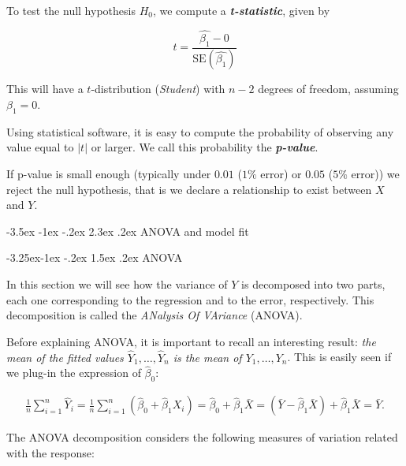 \documentclass[]{book}
\makeatletter
\renewcommand\section{\@startsection {section}{1}{\z@}%
                                   {-3.5ex \@plus -1ex \@minus -.2ex}%
                                   {2.3ex \@plus.2ex}%
                                   {\normalfont\Large\bfseries\color{ForestGreen}}}
\renewcommand\subsection{\@startsection{subsection}{2}{\z@}%
                                     {-3.25ex\@plus -1ex \@minus -.2ex}%
                                     {1.5ex \@plus .2ex}%
                                     {\normalfont\large\bfseries\color{Violet}}}
\theoremstyle{definition}
\theoremstyle{definition}
\theoremstyle{definition}
\theoremstyle{remark}
\makeatother
\begin{document}
To test the null hypothesis \(H_0\), we compute a
\textbf{\emph{t-statistic}}, given by

\[ t = \frac{\hat{\beta_1} - 0}{\text{SE}(\hat{\beta_1})} \]

This will have a \(t\)-distribution (\emph{Student}) with \(n-2\)
degrees of freedom, assuming \(\beta_1=0\).

Using statistical software, it is easy to compute the probability of
observing any value equal to \(|t|\) or larger. We call this probability
the \textbf{\emph{p-value}}.

If p-value is small enough (typically under \(0.01\) (\(1\%\) error) or
\(0.05\) (\(5\%\) error)) we reject the null hypothesis, that is we
declare a relationship to exist between \(X\) and \(Y\).

\section{ANOVA and model fit}\label{anova-and-model-fit}

\subsection{ANOVA}\label{anova}

In this section we will see how the variance of \(Y\) is decomposed into
two parts, each one corresponding to the regression and to the error,
respectively. This decomposition is called the \emph{ANalysis Of
VAriance} (ANOVA).

Before explaining ANOVA, it is important to recall an interesting
result: \emph{the mean of the fitted values \(\hat Y_1,\ldots,\hat Y_n\)
is the mean of \(Y_1,\ldots, Y_n\)}. This is easily seen if we plug-in
the expression of \(\hat\beta_0\):

\begin{align*}
\frac{1}{n}\sum_{i=1}^n \hat Y_i=\frac{1}{n}\sum_{i=1}^n \left(\hat \beta_0+\hat\beta_1X_i\right)=\hat \beta_0+\hat\beta_1\bar X=\left(\bar Y - \hat\beta_1\bar X \right) + \hat\beta_1\bar X=\bar Y.
\end{align*}

The ANOVA decomposition considers the following measures of variation
related with the response:
\end{document}
